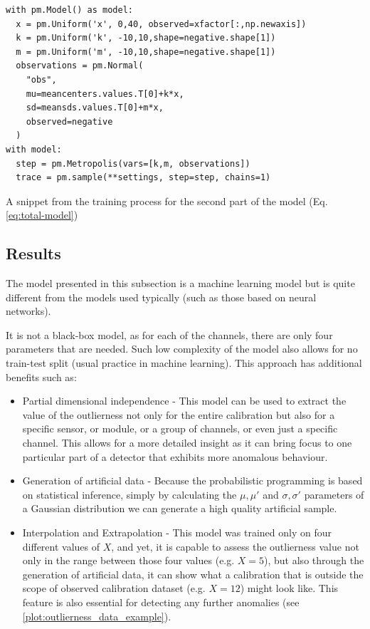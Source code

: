 \begin{listing}[H]
\begin{verbatim}
with pm.Model() as model:
  x = pm.Uniform('x', 0,40, observed=xfactor[:,np.newaxis])
  k = pm.Uniform('k', -10,10,shape=negative.shape[1])
  m = pm.Uniform('m', -10,10,shape=negative.shape[1])
  observations = pm.Normal(
    "obs",
    mu=meancenters.values.T[0]+k*x,
    sd=meansds.values.T[0]+m*x,
    observed=negative
  )
with model:
  step = pm.Metropolis(vars=[k,m, observations])
  trace = pm.sample(**settings, step=step, chains=1)
\end{verbatim}
\caption{A snippet from the training process for the second part of the model (Eq. \ref{eq:total-model})}
\label{listing:calina2}
\end{listing}

\subsection{Results}

The model presented in this subsection is a machine learning model but is quite different from the models used typically (such as those based on neural networks).

It is not a black-box model, as for each of the channels, there are only four parameters that are needed. Such low complexity of the model also allows for no train-test split (usual practice in machine learning).
This approach has additional benefits such as:

\begin{itemize}
  \item Partial dimensional independence - This model can be used to extract the value of the outlierness not only for the entire calibration but also for a specific sensor, or module, or a group of channels, or even just a specific channel. This allows for a more detailed insight as it can bring focus to one particular part of a detector that exhibits more anomalous behaviour.
  \item Generation of artificial data - Because the probabilistic programming is based on statistical inference, simply by calculating the $\mu, \mu\prime$ and $\sigma, \sigma\prime$ parameters of a Gaussian distribution we can generate a high quality artificial sample.
  \item Interpolation and Extrapolation - This model was trained only on four different values of $X$, and yet, it is capable to assess the outlierness value not only in the range between those four values (e.g. $X=5$), but also through the generation of artificial data, it can show what a calibration that is outside the scope of observed calibration dataset (e.g. $X=12$) might look like. This feature is also essential for detecting any further anomalies (see \ref{plot:outlierness_data_example}).
\end{itemize}


